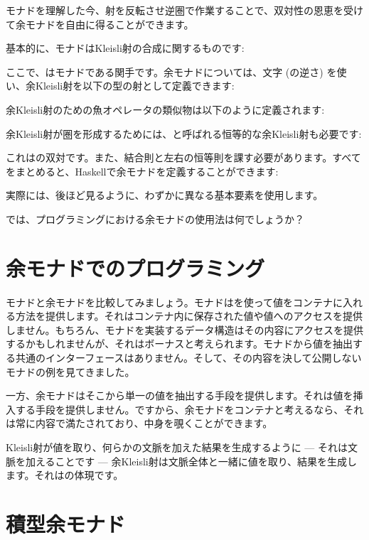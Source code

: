 
\lettrine[lhang=0.17]{モ}{ナド}を理解した今、射を反転させ逆圏で作業することで、双対性の恩恵を受けて余モナドを自由に得ることができます。

基本的に、モナドはKleisli射の合成に関するものです: 

ここで、はモナドである関手です。余モナドについては、文字 (の逆さ) を使い、余Kleisli射を以下の型の射として定義できます: 

余Kleisli射のための魚オペレータの類似物は以下のように定義されます: 

余Kleisli射が圏を形成するためには、と呼ばれる恒等的な余Kleisli射も必要です: 

これはの双対です。また、結合則と左右の恒等則を課す必要があります。すべてをまとめると、Haskellで余モナドを定義することができます: 

実際には、後ほど見るように、わずかに異なる基本要素を使用します。

では、プログラミングにおける余モナドの使用法は何でしょうか？

\section{余モナドでのプログラミング}

モナドと余モナドを比較してみましょう。モナドはを使って値をコンテナに入れる方法を提供します。それはコンテナ内に保存された値や値へのアクセスを提供しません。もちろん、モナドを実装するデータ構造はその内容にアクセスを提供するかもしれませんが、それはボーナスと考えられます。モナドから値を抽出する共通のインターフェースはありません。そして、その内容を決して公開しないモナドの例を見てきました。

一方、余モナドはそこから単一の値を抽出する手段を提供します。それは値を挿入する手段を提供しません。ですから、余モナドをコンテナと考えるなら、それは常に内容で満たされており、中身を覗くことができます。

Kleisli射が値を取り、何らかの文脈を加えた結果を生成するように --- それは文脈を加えることです --- 余Kleisli射は文脈全体と一緒に値を取り、結果を生成します。それはの体現です。

\section{積型余モナド}

